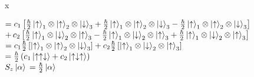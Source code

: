 x\documentclass[12pt]{article}
\begin{document}
\hspace*{3em}$=c_1\left[\frac{\hbar}{2}\ket{\uparrow}_1\otimes \ket{\uparrow}_2\otimes \ket{\downarrow}_3 + \frac{\hbar}{2}\ket{\uparrow}_1\otimes \ket{\uparrow}_2\otimes \ket{\downarrow}_3 -\frac{\hbar}{2}\ket{\uparrow}_1 \otimes \ket{\uparrow}_2\otimes \ket{\downarrow}_3\right]$\vspace{0.5em}\\
\hspace*{5em}$+ \, c_2 \left[\frac{\hbar}{2}\ket{\uparrow}_1 \otimes \ket{\downarrow}_2\otimes\ket{\uparrow}_3 - \frac{\hbar}{2}\ket{\uparrow}_1\otimes\ket{\downarrow}_2\otimes\ket{\uparrow}_3 + \frac{\hbar}{2}\ket{\uparrow}_1 \otimes \ket{\downarrow}_2 \otimes \ket{\uparrow}_3\right]$\vspace{0.5em}\\
\hspace*{3em}$=c_1 \frac{\hbar}{2}\left[\ket{\uparrow}_1\otimes \ket{\uparrow}_2 \otimes \ket{\downarrow}_3\right] + c_2 \frac{\hbar}{2}\left[\ket{\uparrow}_1 \otimes \ket{\downarrow}_2 \otimes \ket{\uparrow}_3\right]$\vspace{0.5em}\\
\hspace*{3em}$= \frac{\hbar}{2} \left(c_1 \ket{\uparrow\uparrow\downarrow} + c_2\ket{\uparrow\downarrow\uparrow}\right)$\vspace{0.5em}\\
$S_z \ket{\alpha} \, = \frac{\hbar}{2}\ket{\alpha}$ \hspace{2em} \checkmark


\newpage
\end{document}
